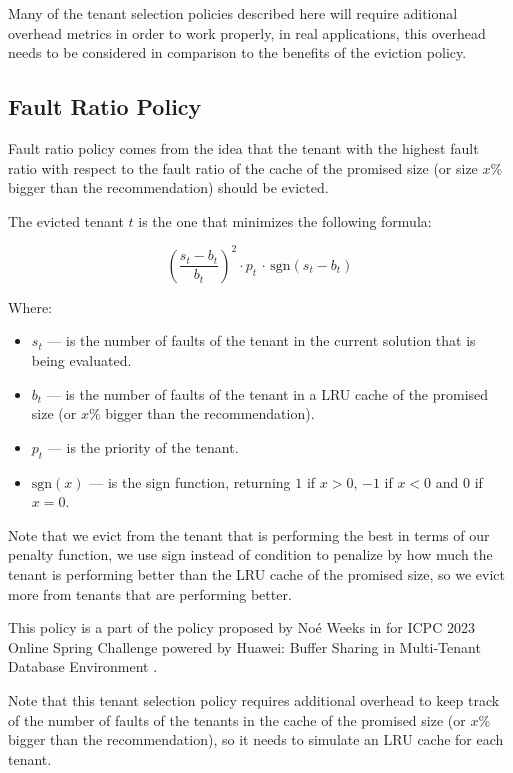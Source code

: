Many of the tenant selection policies described here will require aditional overhead 
metrics in order to work properly, in real applications, this overhead needs to be 
considered in comparison to the benefits of the eviction policy.

\subsection{Fault Ratio Policy}

Fault ratio policy comes from the idea that the tenant with the highest fault ratio
with respect to the fault ratio of the cache of the promised size (or size $x\%$ bigger than
the recommendation) should be evicted.

The evicted tenant $t$ is the one that minimizes the following formula:

$$
\left( \frac{s_t - b_t}{b_t} \right) ^2 \cdot p_t \, \cdot \, \text{sgn}( s_t - b_t )
$$

Where:

\begin{itemize}
    \item $s_t$ --- is the number of faults of the tenant in the current solution that is being evaluated.
    \item $b_t$ --- is the number of faults of the tenant in a LRU cache of the promised size (or $x\%$ bigger than the recommendation).
    \item $p_t$ --- is the priority of the tenant.
    \item $\text{sgn}(x)$ --- is the sign function, returning $1$ if $x > 0$, $-1$ if $x < 0$ and $0$ if $x = 0$.
\end{itemize}

Note that we evict from the tenant that is performing the best in terms of our penalty
function, we use sign instead of condition to penalize by how much the tenant is performing
better than the LRU cache of the promised size, so we evict more from tenants that are
performing better.

This policy is a part of the policy proposed by Noé Weeks in \cite{noe-weeks-comments} for 
ICPC 2023 Online Spring Challenge powered by Huawei: Buffer Sharing in Multi-Tenant Database Environment \cite{huawei-challenge}.

Note that this tenant selection policy requires additional overhead to keep track of the
number of faults of the tenants in the cache of the promised size (or $x\%$ bigger than the recommendation),
so it needs to simulate an LRU cache for each tenant.

